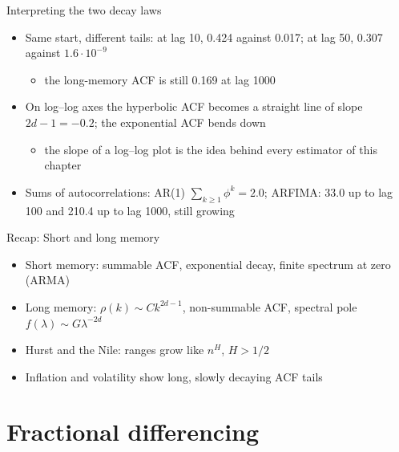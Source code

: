 \begin{frame}{Interpreting the two decay laws}
\itemsize{\small}
\begin{itemize}
    \item Same start, different tails: at lag 10, 0.424 against 0.017; at lag 50, 0.307 against $1.6 \cdot 10^{-9}$
    \begin{itemize}
        \item the long-memory ACF is still 0.169 at lag 1000
    \end{itemize}
    \item On log--log axes the hyperbolic ACF becomes a straight line of slope $2d - 1 = -0.2$; the exponential ACF bends down
    \begin{itemize}
        \item the slope of a log--log plot is the idea behind every estimator of this chapter
    \end{itemize}
    \item Sums of autocorrelations: AR(1) $\sum_{k\ge1}\phi^k = 2.0$; ARFIMA: 33.0 up to lag 100 and 210.4 up to lag 1000, still growing
\end{itemize}
\end{frame}

\begin{frame}{Recap: Short and long memory}
\itemsize{\small}
\begin{itemize}
    \item Short memory: summable ACF, exponential decay, finite spectrum at zero (ARMA)
    \item Long memory: $\rho(k) \sim Ck^{2d-1}$, non-summable ACF, spectral pole $f(\lambda) \sim G\lambda^{-2d}$
    \item Hurst and the Nile: ranges grow like $n^H$, $H > 1/2$
    \item Inflation and volatility show long, slowly decaying ACF tails
\end{itemize}
\end{frame}


\section{Fractional differencing}

